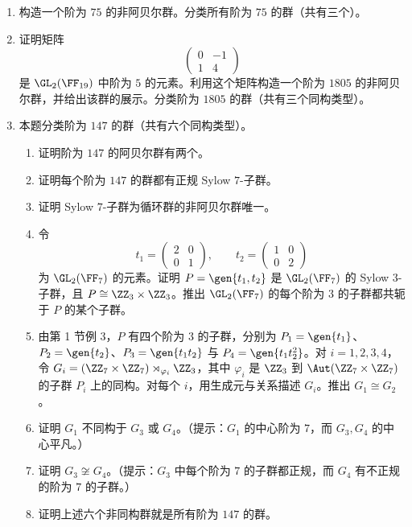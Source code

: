 \begin{enumerate}[label=\arabic*.]
  \item 构造一个阶为 $75$ 的非阿贝尔群。分类所有阶为 $75$ 的群（共有三个）。

  \item 证明矩阵
  \[
    \begin{pmatrix}0&-1\\1&4\end{pmatrix}
  \]
  是 $\GL_2(\FF_{19})$ 中阶为 $5$ 的元素。利用这个矩阵构造一个阶为 $1805$ 的非阿贝尔群，并给出该群的展示。分类阶为 $1805$ 的群（共有三个同构类型）。

  \item 本题分类阶为 $147$ 的群（共有六个同构类型）。
  \begin{enumerate}[label=(\alph*)]
    \item 证明阶为 $147$ 的阿贝尔群有两个。
    \item 证明每个阶为 $147$ 的群都有正规 Sylow $7$-子群。
    \item 证明 Sylow $7$-子群为循环群的非阿贝尔群唯一。
    \item 令
    \[
      t_1=\begin{pmatrix}2&0\\0&1\end{pmatrix},
\qquad
      t_2=\begin{pmatrix}1&0\\0&2\end{pmatrix}
    \]
    为 $\GL_2(\FF_7)$ 的元素。证明 $P=\gen{t_1,t_2}$ 是 $\GL_2(\FF_7)$ 的 Sylow $3$-子群，且 $P\cong\ZZ_3\times\ZZ_3$。推出 $\GL_2(\FF_7)$ 的每个阶为 $3$ 的子群都共轭于 $P$ 的某个子群。
    \item 由第 1 节例 3，$P$ 有四个阶为 $3$ 的子群，分别为 $P_1=\gen{t_1}$、$P_2=\gen{t_2}$、$P_3=\gen{t_1t_2}$ 与 $P_4=\gen{t_1t_2^2}$。对 $i=1,2,3,4$，令 $G_i=(\ZZ_7\times\ZZ_7)\rtimes_{\varphi_i}\ZZ_3$，其中 $\varphi_i$ 是 $\ZZ_3$ 到 $\Aut(\ZZ_7\times\ZZ_7)$ 的子群 $P_i$ 上的同构。对每个 $i$，用生成元与关系描述 $G_i$。推出 $G_1\cong G_2$。
    \item 证明 $G_1$ 不同构于 $G_3$ 或 $G_4$。（提示：$G_1$ 的中心阶为 $7$，而 $G_3,G_4$ 的中心平凡。）
    \item 证明 $G_3\not\cong G_4$。（提示：$G_3$ 中每个阶为 $7$ 的子群都正规，而 $G_4$ 有不正规的阶为 $7$ 的子群。）
    \item 证明上述六个非同构群就是所有阶为 $147$ 的群。
  \end{enumerate}


\end{enumerate}
